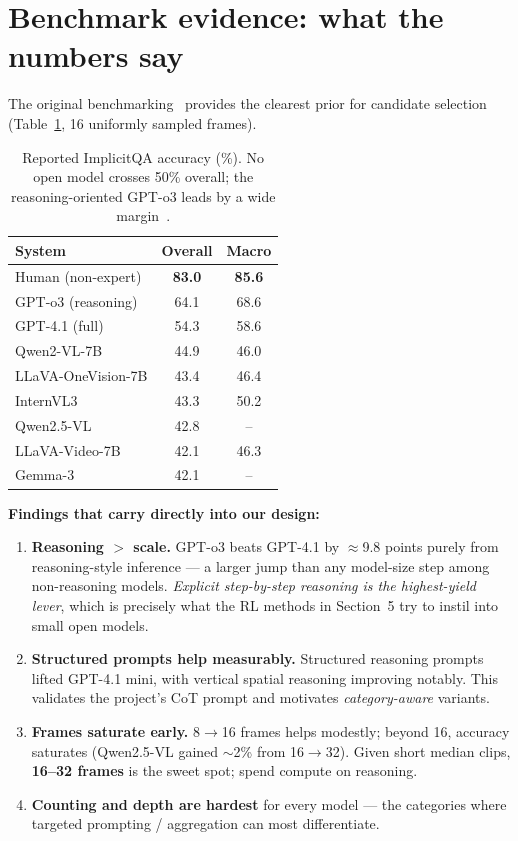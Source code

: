 \documentclass[11pt]{article}
\newcommand{\best}[1]{\textbf{#1}}
\begin{document}
\section{Benchmark evidence: what the numbers say}
The original benchmarking~\cite{implicitqa} provides the clearest prior for
candidate selection (Table~\ref{tab:baselines}, 16 uniformly sampled frames).

\begin{table}[ht]
\centering
\small
\begin{tabular}{l c c}
\toprule
\textbf{System} & \textbf{Overall} & \textbf{Macro} \\
\midrule
Human (non-expert)            & \best{83.0} & \best{85.6} \\
\midrule
GPT-o3 (reasoning)            & 64.1 & 68.6 \\
GPT-4.1 (full)               & 54.3 & 58.6 \\
\midrule
Qwen2-VL-7B                  & 44.9 & 46.0 \\
LLaVA-OneVision-7B           & 43.4 & 46.4 \\
InternVL3                    & 43.3 & 50.2 \\
Qwen2.5-VL                   & 42.8 & --   \\
LLaVA-Video-7B               & 42.1 & 46.3 \\
Gemma-3                      & 42.1 & --   \\
\bottomrule
\end{tabular}
\caption{Reported ImplicitQA accuracy (\%). No open model crosses 50\% overall;
the reasoning-oriented GPT-o3 leads by a wide margin~\cite{implicitqa}.}
\label{tab:baselines}
\end{table}

\noindent\textbf{Findings that carry directly into our design:}
\begin{enumerate}[leftmargin=1.4em,itemsep=2pt]
  \item \textbf{Reasoning $>$ scale.} GPT-o3 beats GPT-4.1 by $\approx$9.8 points
  purely from reasoning-style inference --- a larger jump than any model-size step
  among non-reasoning models. \emph{Explicit step-by-step reasoning is the
  highest-yield lever}, which is precisely what the RL methods in Section~5 try to
  instil into small open models.
  \item \textbf{Structured prompts help measurably.} Structured reasoning prompts
  lifted GPT-4.1 mini, with vertical spatial reasoning improving notably. This
  validates the project's CoT prompt and motivates \emph{category-aware} variants.
  \item \textbf{Frames saturate early.} 8$\to$16 frames helps modestly; beyond 16,
  accuracy saturates (Qwen2.5-VL gained $\sim$2\% from 16$\to$32). Given short
  median clips, \best{16--32 frames} is the sweet spot; spend compute on reasoning.
  \item \textbf{Counting and depth are hardest} for every model --- the categories
  where targeted prompting / aggregation can most differentiate.
\end{enumerate}
\end{document}
